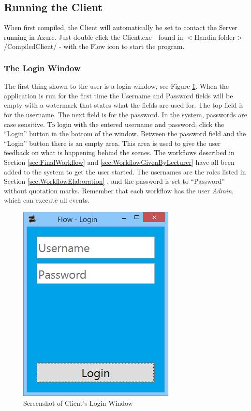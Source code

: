 \subsection{Running the Client}
When first compiled, the Client will automatically be set to contact the Server running in Azure. Just double click the Client.exe - found in $<$Handin folder$>$/CompiledClient/ -  with the Flow icon to start the program.

\subsubsection{The Login Window}
The first thing shown to the user is a login window, see Figure \ref{fig:LoginWindow}. When the application is run for the first time the Username and Password fields will be empty with a watermark that states what the fields are used for. \newline
The top field is for the username. The next field is for the password. In the system, passwords are case sensitive. \newline
To login with the entered username and password, click the “Login” button in the bottom of the window. \newline
Between the password field and the “Login” button there is an empty area. This area is used to give the user feedback on what is happening behind the scenes. \newline
The workflows described in Section \ref{sec:FinalWorkflow}  and \ref{sec:WorkflowGivenByLecturer}  have all been added to the system to get the user started. The usernames are the roles listed in Section \ref{sec:WorkflowElaboration} , and the password is set to “Password” without quotation marks. Remember that each workflow has the user \textit{Admin}, which can execute all events.

\begin{figure}
\centering
\includegraphics[width=0.5\linewidth]{Figures/LoginWindow}
\caption{\label{fig:LoginWindow} Screenshot of Client's Login Window}
\end{figure}


